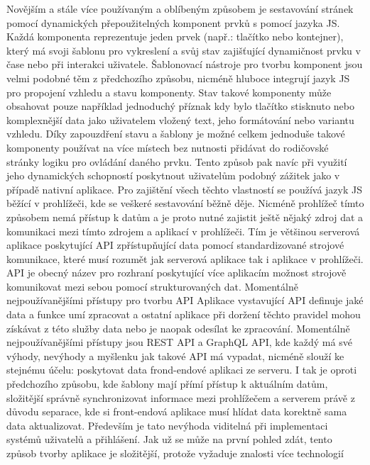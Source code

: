 	Novějším a stále více používaným a oblíbeným způsobem je sestavování stránek pomocí dynamických přepoužitelných
	komponent prvků s pomocí jazyka \ac{JS}.
	Každá komponenta reprezentuje jeden prvek (např.: tlačítko nebo kontejner), který má svoji šablonu pro vykreslení
	a svůj stav zajišťující dynamičnost prvku v čase nebo při interakci uživatele.
	Šablonovací nástroje pro tvorbu komponent jsou velmi podobné těm z předchozího způsobu, nicméně hluboce integrují
	jazyk \ac{JS} pro propojení vzhledu a stavu komponenty.
	Stav takové komponenty může obsahovat pouze například jednoduchý příznak kdy bylo tlačítko stisknuto nebo komplexnější
	data jako uživatelem vložený text, jeho formátování nebo variantu vzhledu.
	Díky zapouzdření stavu a šablony je možné celkem jednoduše takové komponenty používat na více místech bez
	nutnosti přidávat do rodičovské stránky logiku pro ovládání daného prvku.
	Tento způsob pak navíc při využití jeho dynamických schopností poskytnout uživatelům podobný zážitek jako v případě
	nativní aplikace.
	Pro zajištění všech těchto vlastností se používá jazyk \ac{JS} běžící v prohlížeči, kde se veškeré sestavování běžně
	děje.
	Nicméně prohlížeč tímto způsobem nemá přístup k datům a je proto nutné zajistit ještě nějaký zdroj dat a komunikaci
	mezi tímto zdrojem a aplikací v prohlížeči.
	Tím je většinou serverová aplikace poskytující \ac{API} zpřístupňující data pomocí standardizované strojové komunikace,
	které musí rozumět jak serverová aplikace tak i aplikace v prohlížeči.
	\ac{API} je obecný název pro rozhraní poskytující více aplikacím možnost strojově komunikovat mezi sebou pomocí
	strukturovaných dat.
	Momentálně nejpoužívanějšími přístupy pro tvorbu \ac{API}
	Aplikace vystavující \ac{API} definuje jaké data a funkce umí zpracovat a ostatní aplikace při doržení těchto pravidel
	mohou získávat z této služby data nebo je naopak odesílat ke zpracování.
	Momentálně nejpoužívanějšími přístupy jsou \ac{REST} \ac{API} a GraphQL \ac{API}, kde každý má své výhody, nevýhody
	a myšlenku jak takové \ac{API} má vypadat, nicméně slouží ke stejnému účelu: poskytovat data frond-endové aplikaci
	ze serveru.
	I tak je oproti předchozího způsobu, kde šablony mají přímí přístup k aktuálním datům, složitější správně synchronizovat
	informace mezi prohlížečem a serverem právě z důvodu separace, kde si front-endová aplikace musí hlídat data
	korektně sama data aktualizovat.
	Především je tato nevýhoda viditelná při implementaci systémů uživatelů a přihlášení.
	Jak už se může na první pohled zdát, tento způsob tvorby aplikace je složitější, protože vyžaduje znalosti více technologií
